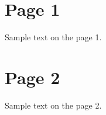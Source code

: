 \documentclass{article}
\begin{document}
\section*{Page 1}
Sample text on the page 1.
\newpage
\section*{Page 2}
Sample text on the page 2.
\end{document}
